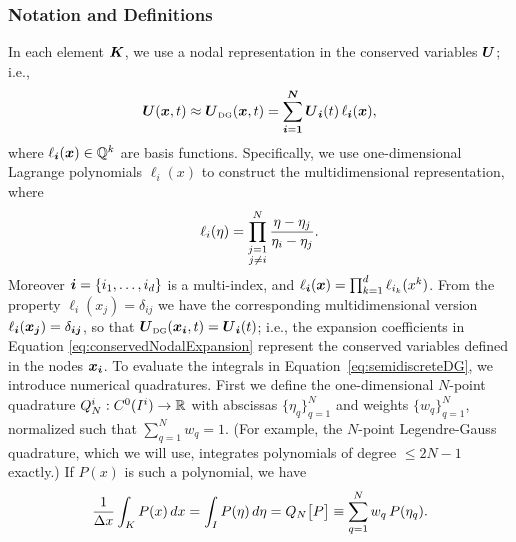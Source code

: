 \documentclass[10pt,preprint]{aastex}
\begin{document}
\subsubsection{Notation and Definitions}

In each element $\boldsymbol{K}$, we use a nodal representation in the conserved variables $\boldsymbol{U}$; i.e.,
\begin{equation}
  \boldsymbol{U}(\boldsymbol{x},t)\approx
  \boldsymbol{U}_{\mbox{\tiny DG}}(\boldsymbol{x},t)=\sum_{\boldsymbol{i}=\boldsymbol{1}}^{\boldsymbol{N}}\boldsymbol{U}_{\boldsymbol{i}}(t)\,\ell_{\boldsymbol{i}}(\boldsymbol{x}),
  \label{eq:conservedNodalExpansion}
\end{equation}
where $\ell_{\boldsymbol{i}}(\boldsymbol{x})\in\mathbb{Q}^{k}$ are basis functions.  
Specifically, we use one-dimensional Lagrange polynomials $\ell_{i}(x)$ to construct the multidimensional representation, where
\begin{equation}
  \ell_{i}(\eta)=
  \prod_{\substack{j=1\\j\ne i}}^{N}\frac{\eta-\eta_{j}}{\eta_{i}-\eta_{j}}.  
\end{equation}
Moreover $\boldsymbol{i}=\{i_{1},\ldots,i_{d}\}$ is a multi-index, and $\ell_{\boldsymbol{i}}(\boldsymbol{x})=\prod_{k=1}^{d}\ell_{i_{k}}(x^{k})$.  
From the property $\ell_{i}(x_{j})=\delta_{ij}$ we have the corresponding multidimensional version $\ell_{\boldsymbol{i}}(\boldsymbol{x}_{\boldsymbol{j}})=\delta_{\boldsymbol{i}\boldsymbol{j}}$, so that $\boldsymbol{U}_{\mbox{\tiny DG}}(\boldsymbol{x}_{\boldsymbol{i}},t)=\boldsymbol{U}_{\boldsymbol{i}}(t)$; i.e., the expansion coefficients in Equation \eqref{eq:conservedNodalExpansion} represent the conserved variables defined in the nodes $\boldsymbol{x}_{\boldsymbol{i}}$.  
To evaluate the integrals in Equation~\eqref{eq:semidiscreteDG}, we introduce numerical quadratures.  
First we define the one-dimensional $N$-point quadrature $Q_{N}^{i}:C^{0}(I^{i})\to\mathbb{R}$ with abscissas $\{\eta_{q}\}_{q=1}^{N}$ and weights $\{w_{q}\}_{q=1}^{N}$, normalized such that $\sum_{q=1}^{N}w_{q}=1$.  
(For example, the $N$-point Legendre-Gauss quadrature, which we will use, integrates polynomials of degree $\le 2N-1$ exactly.)
If $P(x)$ is such a polynomial, we have
\begin{equation}
  \frac{1}{\Delta x}\int_{K}P(x)\,dx=\int_{I}P(\eta)\,d\eta=Q_{N}\big[P\big]\equiv\sum_{q=1}^{N}w_{q}\,P(\eta_{q}).  
\end{equation}
\end{document}

